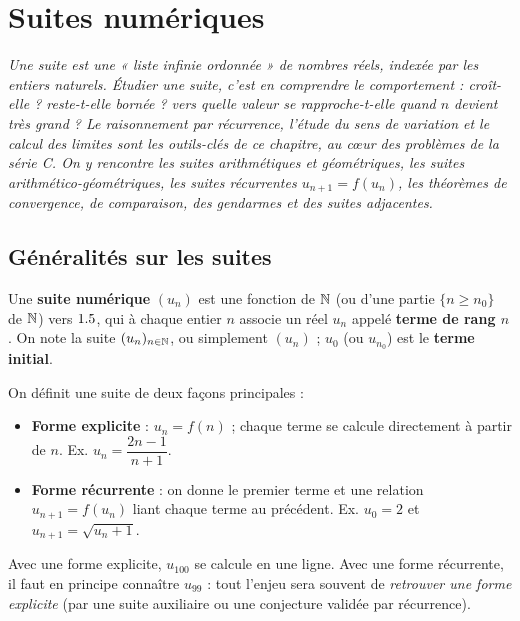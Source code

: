 \chapter{Suites numériques}

\noindent\textit{Une suite est une « liste infinie ordonnée » de nombres réels, indexée par les
entiers naturels. Étudier une suite, c'est en comprendre le comportement : croît-elle ?
reste-t-elle bornée ? vers quelle valeur se rapproche-t-elle quand $n$ devient très grand ?
Le raisonnement par récurrence, l'étude du sens de variation et le calcul des limites sont les
outils-clés de ce chapitre, au cœur des problèmes de la série C. On y rencontre les suites
arithmétiques et géométriques, les suites arithmético-géométriques, les suites récurrentes
$u_{n+1}=f(u_n)$, les théorèmes de convergence, de comparaison, des gendarmes et des suites
adjacentes.}
\vspace{8pt}

\section{Généralités sur les suites}

\begin{definition}
Une \textbf{suite numérique} $(u_n)$ est une fonction de $\mathbb{N}$ (ou d'une partie $\{n\ge n_0\}$ de $\mathbb{N}$)
vers $1.5$, qui à chaque entier $n$ associe un réel $u_n$ appelé \textbf{terme de rang $n$}.
On note la suite $(u_n)_{n\in\mathbb{N}}$, ou simplement $(u_n)$ ; $u_0$ (ou $u_{n_0}$) est le \textbf{terme initial}.
\end{definition}

\begin{definition}
On définit une suite de deux façons principales :
\begin{itemize}
\item \textbf{Forme explicite} : $u_n=f(n)$ ; chaque terme se calcule directement à partir de $n$.
  Ex. $u_n=\dfrac{2n-1}{n+1}$.
\item \textbf{Forme récurrente} : on donne le premier terme et une relation
  $u_{n+1}=f(u_n)$ liant chaque terme au précédent. Ex. $u_0=2$ et $u_{n+1}=\sqrt{u_n+1}$.
\end{itemize}
\end{definition}

\begin{remarque}
Avec une forme explicite, $u_{100}$ se calcule en une ligne. Avec une forme récurrente, il faut
en principe connaître $u_{99}$ : tout l'enjeu sera souvent de \emph{retrouver une forme explicite}
(par une suite auxiliaire ou une conjecture validée par récurrence).
\end{remarque}

